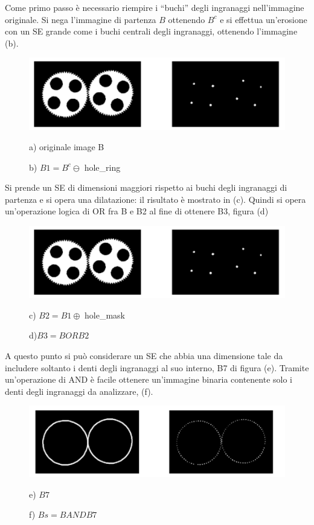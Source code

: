 Come primo passo è necessario riempire i “buchi” degli ingranaggi nell'immagine originale.
Si nega l'immagine di partenza $B$ ottenendo $B^c$ e si effettua un'erosione con un SE grande come i buchi centrali degli ingranaggi, ottenendo l'immagine (b).

\begin{figure}[H]
    \centering
    \includegraphics[width=\linewidth, keepaspectratio]{capitoli/immagini/imgs/orologi2.png}
    \caption*{a) originale image B}
    \caption*{b) $B1=B^c \ominus$ hole\_ring}
\end{figure}

Si prende un SE di dimensioni maggiori rispetto ai buchi degli ingranaggi di partenza e si opera una dilatazione: il risultato è
mostrato in (c). Quindi si opera un'operazione logica di OR fra B e B2 al fine di ottenere B3, figura (d)

\begin{figure}[H]
    \centering
    \includegraphics[width=\linewidth, keepaspectratio]{capitoli/immagini/imgs/orologi3.png}
    \caption*{c) $B2 = B1 \oplus$ hole\_mask}
    \caption*{d)$B3 = B OR B2$}
\end{figure}

A questo punto si può considerare un SE che abbia una dimensione tale da includere soltanto i denti degli ingranaggi al suo interno,
B7 di figura (e). Tramite un'operazione di AND è facile ottenere un'immagine
binaria contenente solo i denti degli ingranaggi da analizzare, (f).

\begin{figure}[H]
    \centering
    \includegraphics[width=\linewidth, keepaspectratio]{capitoli/immagini/imgs/orologi4.png}
    \caption*{e) $B7$}
    \caption*{f) $Bs = B AND B7$}
\end{figure}

